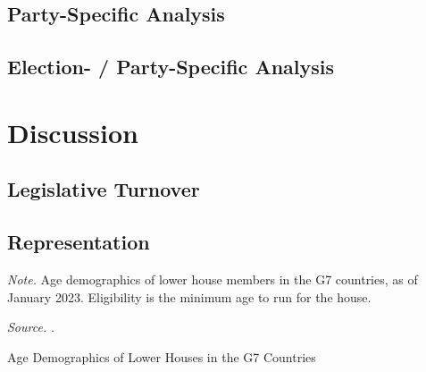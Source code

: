 \documentclass[a4paper, 11pt]{article}
\begin{document}
\subsection{Party-Specific Analysis}






\subsection{Election- / Party-Specific Analysis}




\section{Discussion} \label{sec: dis}


\subsection{Legislative Turnover}


\subsection{Representation}


\begin{table}[htbp]
\begin{center}
\begin{threeparttable}

\begin{tablenotes}[flushleft]
  \scriptsize{
    \item{\textit{Note.} Age demographics of lower house members in the G7 countries, as of January 2023. Eligibility is the minimum age to run for the house.}
    \item{\textit{Source.} \citet{inter-parliamentaryunionDataAgeCountry2024}.}
  }
\end{tablenotes}
\end{threeparttable}
\caption{Age Demographics of Lower Houses in the G7 Countries}
\label{table:intl}
\end{center}
\end{table}
\end{document}
